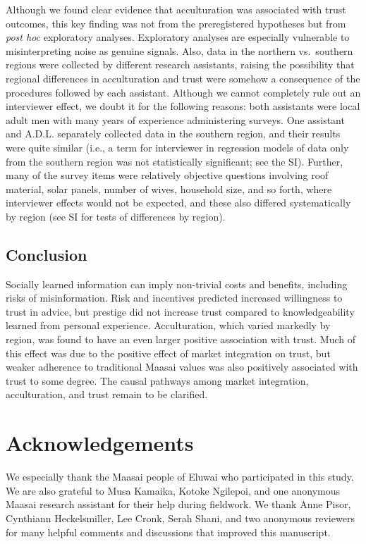 \documentclass[
  11pt,
]{article}
\begin{document}
Although we found clear evidence that acculturation was associated with
trust outcomes, this key finding was not from the preregistered
hypotheses but from \emph{post hoc} exploratory analyses. Exploratory
analyses are especially vulnerable to misinterpreting noise as genuine
signals. Also, data in the northern vs.~southern regions were collected
by different research assistants, raising the possibility that regional
differences in acculturation and trust were somehow a consequence of the
procedures followed by each assistant. Although we cannot completely
rule out an interviewer effect, we doubt it for the following reasons:
both assistants were local adult men with many years of experience
administering surveys. One assistant and A.D.L. separately collected
data in the southern region, and their results were quite similar (i.e.,
a term for interviewer in regression models of data only from the
southern region was not statistically significant; see the SI). Further,
many of the survey items were relatively objective questions involving
roof material, solar panels, number of wives, household size, and so
forth, where interviewer effects would not be expected, and these also
differed systematically by region (see SI for tests of differences by
region).

\hypertarget{conclusion}{%
\subsection{Conclusion}\label{conclusion}}

Socially learned information can imply non-trivial costs and benefits,
including risks of misinformation. Risk and incentives predicted
increased willingness to trust in advice, but prestige did not increase
trust compared to knowledgeability learned from personal experience.
Acculturation, which varied markedly by region, was found to have an
even larger positive association with trust. Much of this effect was due
to the positive effect of market integration on trust, but weaker
adherence to traditional Maasai values was also positively associated
with trust to some degree. The causal pathways among market integration,
acculturation, and trust remain to be clarified.

\hypertarget{acknowledgements}{%
\section{Acknowledgements}\label{acknowledgements}}

We especially thank the Maasai people of Eluwai who participated in this
study. We are also grateful to Musa Kamaika, Kotoke Ngilepoi, and one
anonymous Maasai research assistant for their help during fieldwork. We
thank Anne Pisor, Cynthiann Heckelsmiller, Lee Cronk, Serah Shani, and
two anonymous reviewers for many helpful comments and discussions that
improved this manuscript.
\end{document}
